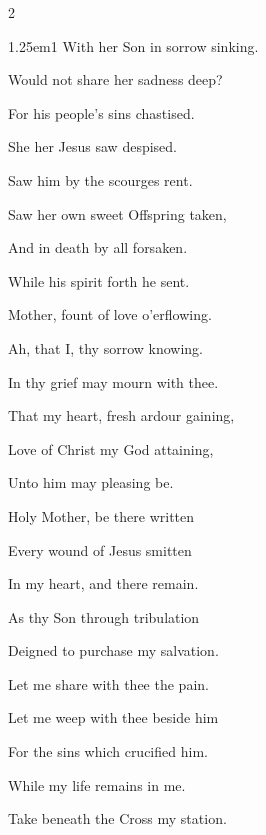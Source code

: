 \begin{multicols}{2}
\begin{hangparas}{1.25em}{1}
With her Son in sorrow sinking.

Would not share her sadness deep?

\vspace{0.5\baselineskip}

For his people's sins chastised.

She her Jesus saw despised.

Saw him by the scourges rent.

\vspace{0.5\baselineskip}

Saw her own sweet Offspring taken,

And in death by all forsaken.

While his spirit forth he sent.

\vspace{0.5\baselineskip}

Mother, fount of love o'erflowing.

Ah, that I, thy sorrow knowing.

In thy grief may mourn with thee.

\vspace{0.5\baselineskip}

That my heart, fresh ardour gaining,

Love of Christ my God attaining,

Unto him may pleasing be.

\vspace{0.5\baselineskip}

Holy Mother, be there written

Every wound of Jesus smitten

In my heart, and there remain.

\vspace{0.5\baselineskip}

As thy Son through tribulation

Deigned to purchase my salvation.

Let me share with thee the pain.

\vspace{0.5\baselineskip}

Let me weep with thee beside him

For the sins which crucified him.

While my life remains in me.

\vspace{0.5\baselineskip}

Take beneath the Cross my station.


\end{hangparas}
\end{multicols}
